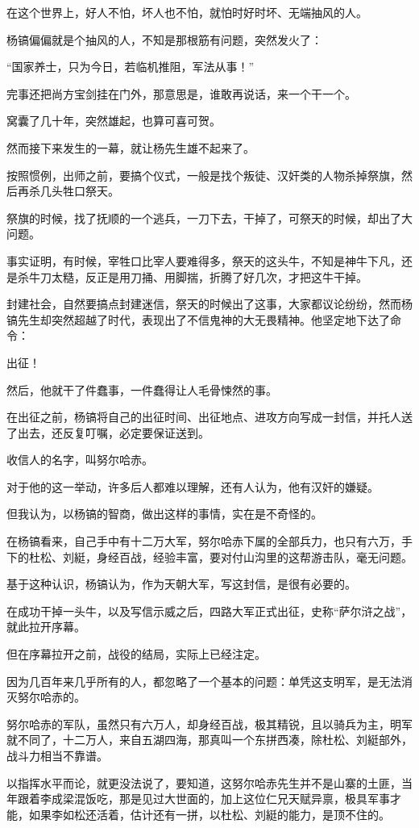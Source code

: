 \begin{multicols}{\theparacolNo}
在这个世界上，好人不怕，坏人也不怕，就怕时好时坏、无端抽风的人。

杨镐偏偏就是个抽风的人，不知是那根筋有问题，突然发火了：

“国家养士，只为今日，若临机推阻，军法从事！”

完事还把尚方宝剑挂在门外，那意思是，谁敢再说话，来一个干一个。

窝囊了几十年，突然雄起，也算可喜可贺。

然而接下来发生的一幕，就让杨先生雄不起来了。

按照惯例，出师之前，要搞个仪式，一般是找个叛徒、汉奸类的人物杀掉祭旗，然后再杀几头牲口祭天。

祭旗的时候，找了抚顺的一个逃兵，一刀下去，干掉了，可祭天的时候，却出了大问题。

事实证明，有时候，宰牲口比宰人要难得多，祭天的这头牛，不知是神牛下凡，还是杀牛刀太糙，反正是用刀捅、用脚揣，折腾了好几次，才把这牛干掉。

封建社会，自然要搞点封建迷信，祭天的时候出了这事，大家都议论纷纷，然而杨镐先生却突然超越了时代，表现出了不信鬼神的大无畏精神。他坚定地下达了命令：

出征！

然后，他就干了件蠢事，一件蠢得让人毛骨悚然的事。

在出征之前，杨镐将自己的出征时间、出征地点、进攻方向写成一封信，并托人送了出去，还反复叮嘱，必定要保证送到。

收信人的名字，叫努尔哈赤。

对于他的这一举动，许多后人都难以理解，还有人认为，他有汉奸的嫌疑。

但我认为，以杨镐的智商，做出这样的事情，实在是不奇怪的。

在杨镐看来，自己手中有十二万大军，努尔哈赤下属的全部兵力，也只有六万，手下的杜松、刘綎，身经百战，经验丰富，要对付山沟里的这帮游击队，毫无问题。

基于这种认识，杨镐认为，作为天朝大军，写这封信，是很有必要的。

在成功干掉一头牛，以及写信示威之后，四路大军正式出征，史称“萨尔浒之战”，就此拉开序幕。

但在序幕拉开之前，战役的结局，实际上已经注定。

因为几百年来几乎所有的人，都忽略了一个基本的问题：单凭这支明军，是无法消灭努尔哈赤的。

努尔哈赤的军队，虽然只有六万人，却身经百战，极其精锐，且以骑兵为主，明军就不同了，十二万人，来自五湖四海，那真叫一个东拼西凑，除杜松、刘綎部外，战斗力相当不靠谱。

以指挥水平而论，就更没法说了，要知道，这努尔哈赤先生并不是山寨的土匪，当年跟着李成梁混饭吃，那是见过大世面的，加上这位仁兄天赋异禀，极具军事才能，如果李如松还活着，估计还有一拼，以杜松、刘綎的能力，是顶不住的。


\end{multicols}
